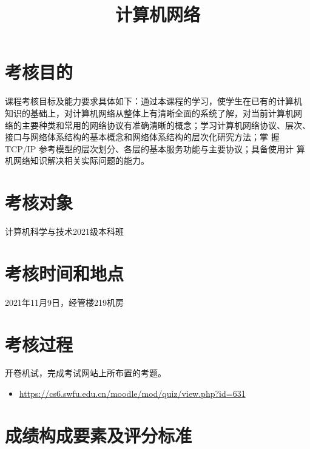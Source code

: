 \documentclass{swfuassessment}
\title{计算机网络}
\begin{document}
\headone{}

\section{考核目的}

课程考核目标及能力要求具体如下：通过本课程的学习，使学生在已有的计算机
知识的基础上，对计算机网络从整体上有清晰全面的系统了解，对当前计算机网
络的主要种类和常用的网络协议有准确清晰的概念；学习计算机网络协议、层次、
接口与网络体系结构的基本概念和网络体系结构的层次化研究方法；掌
握 TCP/IP 参考模型的层次划分、各层的基本服务功能与主要协议；具备使用计
算机网络知识解决相关实际问题的能力。

\section{考核对象}

计算机科学与技术2021级本科班

\section{考核时间和地点}

2021年11月9日，经管楼219机房

\section{考核过程}

开卷机试，完成考试网站上所布置的考题。

\begin{itemize}
\item \url{https://cs6.swfu.edu.cn/moodle/mod/quiz/view.php?id=631}
\end{itemize}

\section{成绩构成要素及评分标准}
\end{document}
